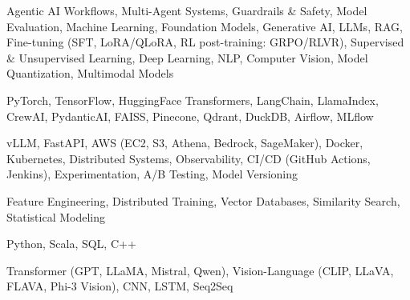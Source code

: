 \documentclass[letter,10pt]{article}
\begin{document}
 Agentic AI Workflows, Multi-Agent Systems, Guardrails \& Safety, Model Evaluation, Machine Learning, Foundation Models, Generative AI, LLMs, RAG, Fine-tuning (SFT, LoRA/QLoRA, RL post-training: GRPO/RLVR), Supervised \& Unsupervised Learning, Deep Learning, NLP, Computer Vision, Model Quantization, Multimodal Models\par\vspace{2pt}

 PyTorch, TensorFlow, HuggingFace Transformers, LangChain, LlamaIndex, CrewAI, PydanticAI, FAISS, Pinecone, Qdrant, DuckDB, Airflow, MLflow\par\vspace{2pt}

 vLLM, FastAPI, AWS (EC2, S3, Athena, Bedrock, SageMaker), Docker, Kubernetes, Distributed Systems, Observability, CI/CD (GitHub Actions, Jenkins), Experimentation, A/B Testing, Model Versioning\par\vspace{2pt}

 Feature Engineering, Distributed Training, Vector Databases, Similarity Search, Statistical Modeling\par\vspace{2pt}

 Python, Scala, SQL, C++\par\vspace{2pt}

 Transformer (GPT, LLaMA, Mistral, Qwen), Vision-Language (CLIP, LLaVA, FLAVA, Phi-3 Vision), CNN, LSTM, Seq2Seq
\end{document}
